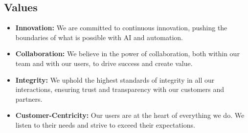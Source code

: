 \documentclass[11pt, a4paper, oneside]{article}
\begin{document}
\subsection{Values}
\begin{itemize}
    \item \textbf{Innovation:} We are committed to continuous innovation, pushing the boundaries of what is possible with AI and automation.
    \item \textbf{Collaboration:} We believe in the power of collaboration, both within our team and with our users, to drive success and create value.
    \item \textbf{Integrity:} We uphold the highest standards of integrity in all our interactions, ensuring trust and transparency with our customers and partners.
    \item \textbf{Customer-Centricity:} Our users are at the heart of everything we do. We listen to their needs and strive to exceed their expectations.
\end{itemize}
\end{document}
